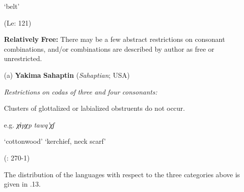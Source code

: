     ‘belt’



(Le\citealt{Sourd1993}: 121)
\z



\ea\label{ex:(3.29)}
  \textbf{Relatively} \textbf{Free:} There may be a few abstract restrictions on consonant combinations, and/or combinations are described by author as free or unrestricted.



(a)  \textbf{Yakima} \textbf{Sahaptin} (\textit{Sahaptian}; USA)



\textit{Restrictions} \textit{on} \textit{codas} \textit{of} \textit{three} \textit{and} \textit{four} \textit{consonants:}



Clusters of glottalized or labialized obstruents do not occur.



e.g.   \textit{χɨpχp}        \textit{tawq’χʃ}



    ‘cottonwood’      ‘kerchief, neck scarf’



(\citealt{HargusBeavert2002}: 270-1)


\z

  The distribution of the languages with respect to the three categories above is given in .13.






